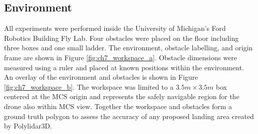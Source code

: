 \subsection{Environment}

All experiments were performed inside the University of Michigan's Ford Robotics Building Fly Lab. Four obstacles were placed on the floor including three boxes and one small ladder. The environment, obstacle labelling, and origin frame are shown in Figure \ref{fig:ch7_workspace_a}. Obstacle dimensions were measured using a ruler and placed at known positions within the environment. An overlay of the environment and obstacles is shown in Figure \ref{fig:ch7_workspace_b}. The workspace was limited to a $3.5m\times3.5m$ box centered at the \ac{MCS} origin and represents the safely navigable region for the drone also within \ac{MCS} view. Together the workspace and obstacles form a ground truth polygon to assess the accuracy of any proposed landing area created by Polylidar3D.

